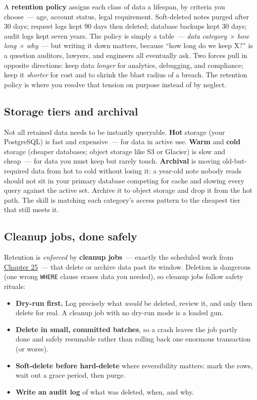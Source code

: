 A \textbf{retention policy} assigns each class of data a lifespan, by criteria you choose~--- age, account status, legal requirement. Soft-deleted notes purged after 30 days; request logs kept 90 days then deleted; database backups kept 30 days; audit logs kept seven years. The policy is simply a table~--- \emph{data category × how long × why}~--- but writing it down matters, because ``how long do we keep X?'' is a question auditors, lawyers, and engineers all eventually ask. Two forces pull in opposite directions: keep data \emph{longer} for analytics, debugging, and compliance; keep it \emph{shorter} for cost and to shrink the blast radius of a breach. The retention policy is where you resolve that tension on purpose instead of by neglect.

\subsection*{Storage tiers and archival}\label{37-reliability:storage-tiers-and-archival}

Not all retained data needs to be instantly queryable. \textbf{Hot} storage (your PostgreSQL) is fast and expensive~--- for data in active use. \textbf{Warm} and \textbf{cold} storage (cheaper databases; object storage like S3 or Glacier) is slow and cheap~--- for data you must keep but rarely touch. \textbf{Archival} is moving old-but-required data from hot to cold without losing it: a year-old note nobody reads should not sit in your primary database competing for cache and slowing every query against the active set. Archive it to object storage and drop it from the hot path. The skill is matching each category's access pattern to the cheapest tier that still meets it.

\subsection*{Cleanup jobs, done safely}\label{37-reliability:cleanup-jobs-done-safely}

Retention is \emph{enforced} by \textbf{cleanup jobs}~--- exactly the scheduled work from \hyperref[ch:25-process-management]{Chapter 25}~--- that delete or archive data past its window. Deletion is dangerous (one wrong \texttt{WHERE} clause erases data you needed), so cleanup jobs follow safety rituals:

\begin{itemize}
\tightlist
\item
  \textbf{Dry-run first.} Log precisely what \emph{would} be deleted, review it, and only then delete for real. A cleanup job with no dry-run mode is a loaded gun.
\item
  \textbf{Delete in small, committed batches}, so a crash leaves the job partly done and safely resumable rather than rolling back one enormous transaction (or worse).
\item
  \textbf{Soft-delete before hard-delete} where reversibility matters: mark the rows, wait out a grace period, then purge.
\item
  \textbf{Write an audit log} of what was deleted, when, and why.
\end{itemize}

